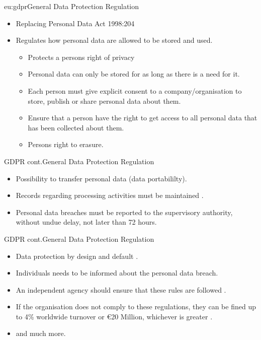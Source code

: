 \documentclass{beamer}
\begin{document}
\begin{frame}{eu:gdpr}{General Data Protection Regulation}
  \begin{itemize}
    \item Replacing Personal Data Act 1998:204
    \item Regulates how personal data are allowed to be stored and used.
      \begin{itemize}
        \item Protects a persons right of privacy\cite[art. 5]{eu:gdpr}
        \item Personal data can only be stored for as long as there is a need
          for it\cite[art. 5]{eu:gdpr}.
      \item Each person must give explicit
        consent to a company/organisation to store, publish or share personal
        data about them\cite[art. 7]{eu:gdpr}.
        \item Ensure that a person have the right to get access to all personal
          data that has been collected about them\cite[art. 15]{eu:gdpr}.
        \item Persons right to erasure\cite[art. 17]{eu:gdpr}. 
      \end{itemize}
  \end{itemize}
\end{frame}
\begin{frame}{GDPR cont.}{General Data Protection Regulation}
    \begin{itemize}
      \item Possibility to transfer personal data (data
          portabililty)\cite[art. 20]{eu:gdpr}.  
      \item Records regarding processing activities must be maintained \cite[art.
        30]{eu:gdpr}.
      \item Personal data breaches must be reported to the supervisory
        authority, without undue delay, not later than 72 hours\cite[art.
        33]{eu:gdpr}.
    \end{itemize}
\end{frame}
\begin{frame}{GDPR cont.}{General Data Protection Regulation}
\begin{itemize}
  \item Data protection by design and default \cite[art. 25]{eu:gdpr}.
      \item Individuals needs to be informed about the personal data
        breach\cite[art. 34]{eu:gdpr}.
    \item An independent agency should ensure that these rules are followed
      \cite[art 51]{eu:gdpr}.
    \item If the organisation does not comply to these regulations, they can be
      fined up to 4\% worldwide turnover or €20 Million, whichever is greater
      \cite[art 83]{eu:gdpr}.
    \item and much more.
\end{itemize}
\end{frame}
\end{document}
